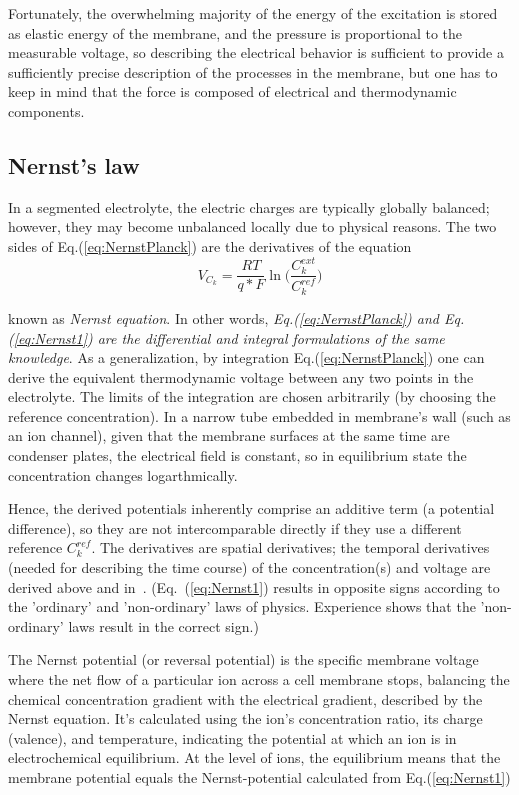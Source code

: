  Fortunately, 
the overwhelming majority of the energy of the excitation
is stored as elastic energy of the membrane, and the pressure is proportional to the measurable voltage, so describing the electrical behavior is sufficient to provide a sufficiently precise description
of the processes in the membrane, but one has to keep in mind
that the force is composed of electrical and thermodynamic components.


\subsection[Nernst's law]{Nernst's law\label{sec:Physics-NernstLaw}}
In a segmented electrolyte, the electric charges are typically globally balanced; however, they may become unbalanced locally due to physical reasons.
 The two sides of Eq.(\ref{eq:NernstPlanck}) are the derivatives of the equation
\begin{equation}
	V_{C_{k}} =\frac{RT}{q*F}\ln{\biggl(\frac{C_{k}^{ext}}{C_{k}^{ref}}\biggr)}\label{eq:Nernst1}
\end{equation}

\noindent \hypertarget{NernstLaw}{known as \textit{Nernst equation}}.  In other words, \textit{Eq.(\ref{eq:NernstPlanck}) and Eq.(\ref{eq:Nernst1}) are the differential and integral formulations of the same knowledge}. As a generalization, by integration Eq.(\ref{eq:NernstPlanck}) one can derive the equivalent
thermodynamic voltage between any two points in the electrolyte. The limits of the integration are chosen arbitrarily (by choosing the reference concentration).
In a narrow tube embedded in membrane's wall (such as an ion channel), given that the membrane surfaces  at the same time
are condenser plates, the electrical field is constant, so in equilibrium state the concentration
changes logarthmically.


Hence, the derived potentials inherently comprise an additive term (a potential difference), so they are not intercomparable directly if they use a different reference $C_{k}^{ref}$.
The derivatives are spatial derivatives; the temporal derivatives (needed for describing the time course) of the concentration(s) and voltage are derived above and in~\cite{VeghNon-ordinaryLaws:2025}.
(Eq.~(\ref{eq:Nernst1}) results in opposite signs according to the 'ordinary' and 'non-ordinary' laws of physics. Experience shows that the 'non-ordinary' laws result in the correct sign.)

The Nernst potential (or reversal potential) is the specific membrane voltage where the net flow of a particular ion across a cell membrane stops, balancing the chemical concentration gradient with the electrical gradient, described by the Nernst equation.
 It's calculated using the ion's concentration ratio, its charge (valence), and temperature, indicating the potential at which an ion is in electrochemical equilibrium.
At the level of ions, the equilibrium means that the membrane potential 
equals the Nernst-potential calculated from Eq.(\ref{eq:Nernst1})


